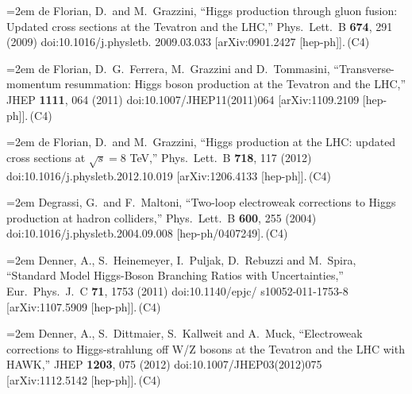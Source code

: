 \documentclass[letter,12pt]{article}
\def\xbibitem#1#2#3{\noindent\hangindent=2em #2\,(#3)}
\begin{document}
\xbibitem{deFlorian:2009hc}{de Florian, D.\ and M.~Grazzini,
  ``Higgs production through gluon fusion: Updated cross sections at the Tevatron and the LHC,''
  Phys.\ Lett.\ B {\bf 674}, 291 (2009)
  doi:10.1016/j.physletb. 2009.03.033
  [arXiv:0901.2427 [hep-ph]].}{C4}

\xbibitem{deFlorian:2011xf}{de Florian, D.\ G.~Ferrera, M.~Grazzini and D.~Tommasini,
  ``Transverse-momentum resummation: Higgs boson production at the Tevatron and the LHC,''
  JHEP {\bf 1111}, 064 (2011)
  doi:10.1007/JHEP11(2011)064
  [arXiv:1109.2109 [hep-ph]].}{C4}

\xbibitem{deFlorian:2012yg}{de Florian, D.\ and M.~Grazzini,
  ``Higgs production at the LHC: updated cross sections at $\sqrt{s}=8$ TeV,''
  Phys.\ Lett.\ B {\bf 718}, 117 (2012)
  doi:10.1016/j.physletb.2012.10.019
  [arXiv:1206.4133 [hep-ph]].}{C4}

\xbibitem{Degrassi:2004mx}{Degrassi, G.\ and F.~Maltoni,
  ``Two-loop electroweak corrections to Higgs production at hadron colliders,''
  Phys.\ Lett.\ B {\bf 600}, 255 (2004)
  doi:10.1016/j.physletb.2004.09.008
  [hep-ph/0407249].}{C4}
  
\xbibitem{Denner:2011mq}{Denner, A., S.~Heinemeyer, I.~Puljak, D.~Rebuzzi and M.~Spira,
  ``Standard Model Higgs-Boson Branching Ratios with Uncertainties,''
  Eur.\ Phys.\ J.\ C {\bf 71}, 1753 (2011)
  doi:10.1140/epjc/ s10052-011-1753-8
  [arXiv:1107.5909 [hep-ph]].}{C4}
  
\xbibitem{Denner:2011id}{Denner, A., S.~Dittmaier, S.~Kallweit and A.~Muck,
  ``Electroweak corrections to Higgs-strahlung off W/Z bosons at the Tevatron and the LHC with HAWK,''
  JHEP {\bf 1203}, 075 (2012)
  doi:10.1007/JHEP03(2012)075
  [arXiv:1112.5142 [hep-ph]].}{C4}
  
\end{document}
